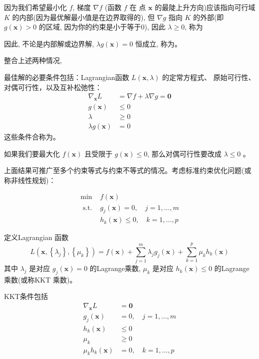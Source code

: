 因为我们希望最小化 $f$, 梯度 $\nabla f$ (函数 $f$ 在 点 $\mathbf{x}$ 的最陡上升方向)应该指向可行域 $K$ 的内部(因为最优解最小值是在边界取得的), 但 $\nabla g$ 指向 $K$ 的外部(即 $g(\mathbf{x})>0$ 的区域, 因为你的约束是小于等于0), 因此 $\lambda \geq 0$, 称为

因此, 不论是内部解或边界解, $\lambda g(\mathbf{x})=0$ 恒成立, 称为。

整合上述两种情况, 

\begin{theorem}
    最佳解的必要条件包括：Lagrangian函数 $L(\mathbf{x}, \lambda)$ 的定常方程式、 原始可行性、对偶可行性，以及互补松弛性：
$$
\begin{aligned}
\nabla_{\mathbf{x}} L &=\nabla f+\lambda \nabla g=\mathbf{0} \\
g(\mathbf{x}) & \leq 0 \\
\lambda & \geq 0 \\
\lambda g(\mathbf{x}) &=0
\end{aligned}
$$
这些条件合称为。

如果我们要最大化 $f(\mathbf{x})$ 且受限于 $g(\mathbf{x}) \leq 0$, 那么对偶可行性要改成 $\lambda \leq 0$ 。
\end{theorem}


上面结果可推广至多个约束等式与约束不等式的情况。考虑标准约束优化问题(或称非线性规划)：

\begin{definition}
    $$
\begin{array}{ll}
\min & f(\mathbf{x}) \\
\text { s.t. } & g_{j}(\mathbf{x})=0, \quad j=1, \ldots, m \\
& h_{k}(\mathbf{x}) \leq 0, \quad k=1, \ldots, p
\end{array}
$$
\end{definition}

\begin{theorem}[标准约束优化的KKT条件]
    定义Lagrangian 函数
$$
L\left(\mathbf{x},\left\{\lambda_{j}\right\},\left\{\mu_{k}\right\}\right)=f(\mathbf{x})+\sum_{j=1}^{m} \lambda_{j} g_{j}(\mathbf{x})+\sum_{k=1}^{p} \mu_{k} h_{k}(\mathbf{x})
$$
其中 $ \lambda_{j} $ 是对应 $ g_{j}(\mathbf{x})=0 $ 的Lagrange乘数, $ \mu_{k} $ 是对应 $ h_{k}(\mathbf{x}) \leq 0 $ 的Lagrange乘数(或称KKT 乘数)。 

KKT条件包括
$$
\begin{aligned}
\nabla_{\mathbf{x}} L &=\mathbf{0} \\
g_{j}(\mathbf{x}) &=0, \quad j=1, \ldots, m \\
h_{k}(\mathbf{x}) & \leq 0 \\
\mu_{k} & \geq 0 \\
\mu_{k} h_{k}(\mathbf{x}) &=0, \quad k=1, \ldots, p
\end{aligned}
$$

\end{theorem}


